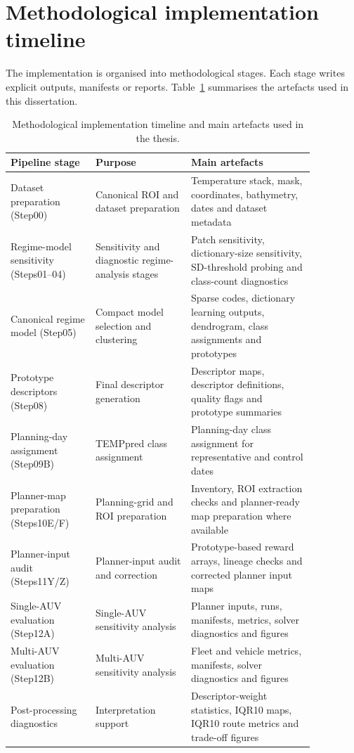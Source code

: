 \section{Methodological implementation timeline}

The implementation is organised into methodological stages. Each stage writes explicit outputs, manifests or reports. Table~\ref{tab:implementation_steps} summarises the artefacts used in this dissertation.

\begin{table}[htbp]
    \centering
    \small
    \caption{Methodological implementation timeline and main artefacts used in the thesis.}
    \label{tab:implementation_steps}
    \begin{tabular}{p{0.24\linewidth}p{0.27\linewidth}p{0.35\linewidth}}
        \hline
        Pipeline stage & Purpose & Main artefacts \\
        \hline
        Dataset preparation (Step00) & Canonical ROI and dataset preparation & Temperature stack, mask, coordinates, bathymetry, dates and dataset metadata \\
        Regime-model sensitivity (Steps01--04) & Sensitivity and diagnostic regime-analysis stages & Patch sensitivity, dictionary-size sensitivity, SD-threshold probing and class-count diagnostics \\
        Canonical regime model (Step05) & Compact model selection and clustering & Sparse codes, dictionary learning outputs, dendrogram, class assignments and prototypes \\
        Prototype descriptors (Step08) & Final descriptor generation & Descriptor maps, descriptor definitions, quality flags and prototype summaries \\
        Planning-day assignment (Step09B) & TEMPpred class assignment & Planning-day class assignment for representative and control dates \\
        Planner-map preparation (Steps10E/F) & Planning-grid and ROI preparation & Inventory, ROI extraction checks and planner-ready map preparation where available \\
        Planner-input audit (Steps11Y/Z) & Planner-input audit and correction & Prototype-based reward arrays, lineage checks and corrected planner input maps \\
        Single-AUV evaluation (Step12A) & Single-AUV sensitivity analysis & Planner inputs, runs, manifests, metrics, solver diagnostics and figures \\
        Multi-AUV evaluation (Step12B) & Multi-AUV sensitivity analysis & Fleet and vehicle metrics, manifests, solver diagnostics and figures \\
        Post-processing diagnostics & Interpretation support & Descriptor-weight statistics, IQR10 maps, IQR10 route metrics and trade-off figures \\
        \hline
    \end{tabular}
\end{table}


